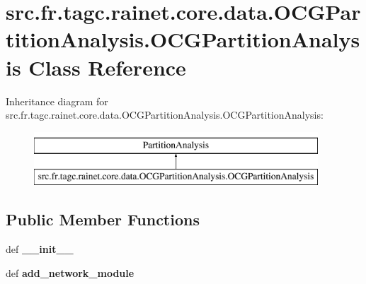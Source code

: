\hypertarget{classsrc_1_1fr_1_1tagc_1_1rainet_1_1core_1_1data_1_1OCGPartitionAnalysis_1_1OCGPartitionAnalysis}{\section{src.\-fr.\-tagc.\-rainet.\-core.\-data.\-O\-C\-G\-Partition\-Analysis.\-O\-C\-G\-Partition\-Analysis Class Reference}
\label{classsrc_1_1fr_1_1tagc_1_1rainet_1_1core_1_1data_1_1OCGPartitionAnalysis_1_1OCGPartitionAnalysis}
}
Inheritance diagram for src.\-fr.\-tagc.\-rainet.\-core.\-data.\-O\-C\-G\-Partition\-Analysis.\-O\-C\-G\-Partition\-Analysis\-:\begin{figure}[H]
\begin{center}
\leavevmode
\includegraphics[height=2.000000cm]{classsrc_1_1fr_1_1tagc_1_1rainet_1_1core_1_1data_1_1OCGPartitionAnalysis_1_1OCGPartitionAnalysis}
\end{center}
\end{figure}
\subsection*{Public Member Functions}
\begin{DoxyCompactItemize}
\item 
\hypertarget{classsrc_1_1fr_1_1tagc_1_1rainet_1_1core_1_1data_1_1OCGPartitionAnalysis_1_1OCGPartitionAnalysis_ad3fb3133f08a930b2e1f8b2e0b4562bf}{def {\bfseries \-\_\-\-\_\-init\-\_\-\-\_\-}}\label{classsrc_1_1fr_1_1tagc_1_1rainet_1_1core_1_1data_1_1OCGPartitionAnalysis_1_1OCGPartitionAnalysis_ad3fb3133f08a930b2e1f8b2e0b4562bf}

\item 
\hypertarget{classsrc_1_1fr_1_1tagc_1_1rainet_1_1core_1_1data_1_1OCGPartitionAnalysis_1_1OCGPartitionAnalysis_aa2389447f606a981fd4a5b41596e4bc9}{def {\bfseries add\-\_\-network\-\_\-module}}\label{classsrc_1_1fr_1_1tagc_1_1rainet_1_1core_1_1data_1_1OCGPartitionAnalysis_1_1OCGPartitionAnalysis_aa2389447f606a981fd4a5b41596e4bc9}

\end{DoxyCompactItemize}

